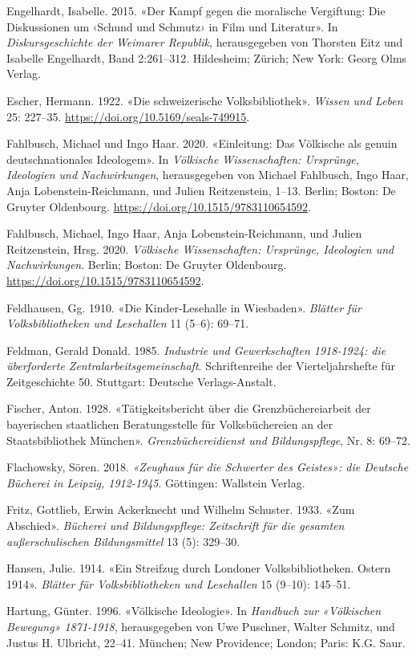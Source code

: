 \documentclass[a4paper,
fontsize=11pt,
oneside,
numbers=noperiodatend,
parskip=half-,
bibliography=totoc,
final
]{scrartcl}
\begin{document}
Engelhardt, Isabelle. 2015. «Der Kampf gegen die moralische Vergiftung:
Die Diskussionen um ‹Schund und Schmutz› in Film und Literatur». In
\emph{Diskursgeschichte der Weimarer Republik}, herausgegeben von
Thorsten Eitz und Isabelle Engelhardt, Band 2:261--312. Hildesheim;
Zürich; New York: Georg Olms Verlag.

Escher, Hermann. 1922. «Die schweizerische Volksbibliothek».
\emph{Wissen und Leben} 25: 227--35.
\url{https://doi.org/10.5169/seals-749915}.

Fahlbusch, Michael und Ingo Haar. 2020. «Einleitung: Das Völkische als
genuin deutschnationales Ideologem». In \emph{Völkische Wissenschaften:
Ursprünge, Ideologien und Nachwirkungen}, herausgegeben von Michael
Fahlbusch, Ingo Haar, Anja Lobenstein-Reichmann, und Julien
Reitzenstein, 1--13. Berlin; Boston: De Gruyter Oldenbourg.
\url{https://doi.org/10.1515/9783110654592}.

Fahlbusch, Michael, Ingo Haar, Anja Lobenstein-Reichmann, und Julien
Reitzenstein, Hrsg. 2020. \emph{Völkische Wissenschaften: Ursprünge,
Ideologien und Nachwirkungen}. Berlin; Boston: De Gruyter Oldenbourg.
\url{https://doi.org/10.1515/9783110654592}.

Feldhausen, Gg. 1910. «Die Kinder-Lesehalle in Wiesbaden». \emph{Blätter
für Volksbibliotheken und Lesehallen} 11 (5--6): 69--71.

Feldman, Gerald Donald. 1985. \emph{Industrie und Gewerkschaften
1918-1924: die überforderte Zentralarbeitsgemeinschaft}. Schriftenreihe
der Vierteljahrshefte für Zeitgeschichte 50. Stuttgart: Deutsche
Verlags-Anstalt.

Fischer, Anton. 1928. «Tätigkeitsbericht über die Grenzbüchereiarbeit
der bayerischen staatlichen Beratungsstelle für Volksbüchereien an der
Staatsbibliothek München». \emph{Grenzbüchereidienst und
Bildungspflege}, Nr. 8: 69--72.

Flachowsky, Sören. 2018. \emph{«Zeughaus für die Schwerter des Geistes»:
die Deutsche Bücherei in Leipzig, 1912-1945}. Göttingen: Wallstein
Verlag.

Fritz, Gottlieb, Erwin Ackerknecht und Wilhelm Schuster. 1933. «Zum
Abschied». \emph{Bücherei und Bildungspflege: Zeitschrift für die
gesamten außerschulischen Bildungsmittel} 13 (5): 329--30.

Hansen, Julie. 1914. «Ein Streifzug durch Londoner Volksbibliotheken.
Ostern 1914». \emph{Blätter für Volksbibliotheken und Lesehallen} 15
(9--10): 145--51.

Hartung, Günter. 1996. «Völkische Ideologie». In \emph{Handbuch zur
«Völkischen Bewegung» 1871-1918}, herausgegeben von Uwe Puschner, Walter
Schmitz, und Justus H. Ulbricht, 22--41. München; New Providence;
London; Paris: K.G. Saur.
\end{document}

